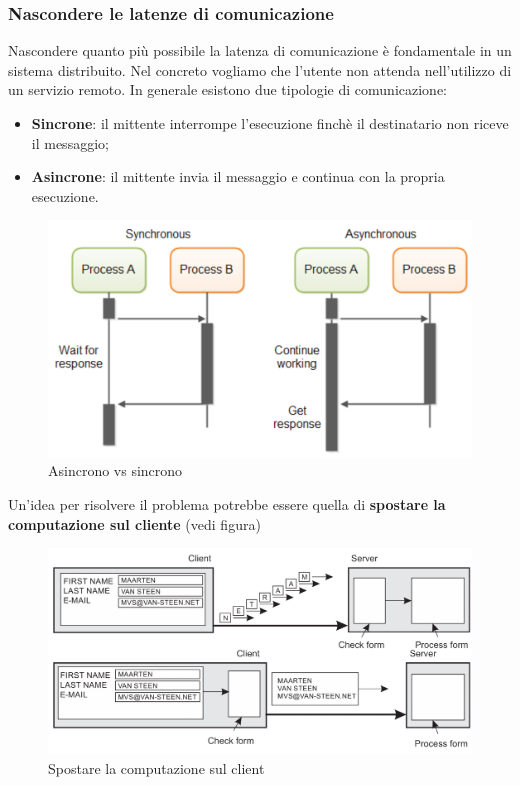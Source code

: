\documentclass[12pt]{article}
\begin{document}
	\subsubsection{Nascondere le latenze di comunicazione}
		Nascondere quanto più possibile la latenza di comunicazione è fondamentale in un sistema distribuito. Nel concreto vogliamo che l'utente non attenda nell'utilizzo di un servizio remoto. In generale esistono due tipologie di comunicazione:
		\begin{itemize}
			\item \textbf{Sincrone}: il mittente interrompe l'esecuzione finchè il destinatario non riceve il messaggio;
			\item \textbf{Asincrone}: il mittente invia il messaggio e continua con la propria esecuzione.
		\end{itemize}
		\begin{figure}[h!]
			\centering
			\includegraphics[scale=0.30]{img/assy.png}
			\caption{Asincrono vs sincrono}
		\end{figure}
		Un'idea per risolvere il problema potrebbe essere quella di \textbf{spostare la computazione sul cliente} (vedi figura)
			\begin{figure}[h!]
			\centering
			\includegraphics[scale=0.30]{img/move.png}
			\caption{Spostare la computazione sul client}
		\end{figure}
\end{document}
